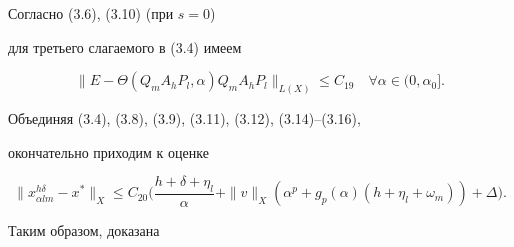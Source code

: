 Согласно (3.6), (3.10) (при $s=0$)


для третьего слагаемого в (3.4) имеем


\begin{equation}


\| E- \Theta (Q_m A_h P_l, \alpha) Q_m A_h P_l \|_{L(X)} \leq


C_{19} \quad \forall \alpha \in (0, \alpha_0].


\tag{3.16}


\end{equation}


Объединяя (3.4), (3.8), (3.9), (3.11), (3.12), (3.14)--(3.16),


окончательно приходим к оценке


\begin{equation}


\| x_{\alpha l m}^{h \delta}- x^{*} \|_X \leq


C_{20} \bigg (\frac{h+ \delta + \eta_l }{\alpha}+


\| v \|_X ({\alpha}^p + g_p(\alpha)(h+ \eta_l +


\omega_m))+ \Delta \bigg ).


\tag{3.17}


\end{equation}


Таким образом, доказана






